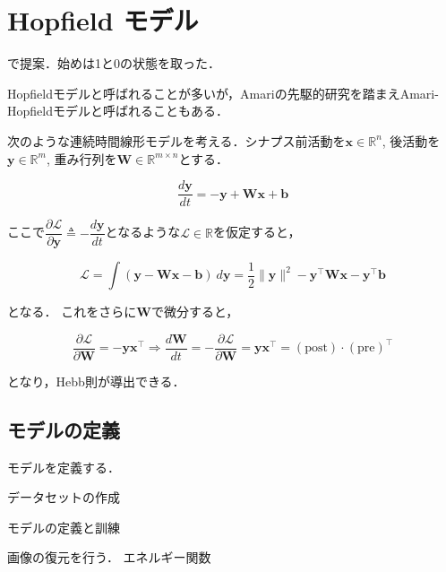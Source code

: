 \section{Hopfield モデル}


\citep{Hopfield1982-vu}で提案．始めは1と0の状態を取った．

Hopfieldモデルと呼ばれることが多いが，Amariの先駆的研究\citep{Amari1972-fq}を踏まえAmari-Hopfieldモデルと呼ばれることもある．

次のような連続時間線形モデルを考える．シナプス前活動を$\mathbf{x}\in \mathbb{R}^n$, 後活動を$\mathbf{y}\in \mathbb{R}^m$, 重み行列を$\mathbf{W}\in \mathbb{R}^{m\times n}$とする．


\begin{equation}
\frac{d\mathbf{y}}{dt}=-\mathbf{y}+\mathbf{W}\mathbf{x}+\mathbf{b}
\end{equation}


ここで$\dfrac{\partial\mathcal{L}}{\partial\mathbf{y}}\triangleq-\dfrac{d\mathbf{y}}{dt}$となるような$\mathcal{L}\in \mathbb{R}$を仮定すると，


\begin{equation}
\mathcal{L}=\int \left(\mathbf{y}-\mathbf{W}\mathbf{x}-\mathbf{b}\right)\ d\mathbf{y}=\frac{1}{2}\|\mathbf{y}\|^2-\mathbf{y}^\top \mathbf{W}\mathbf{x}-\mathbf{y}^\top \mathbf{b}
\end{equation}


となる． これをさらに$\mathbf{W}$で微分すると，


\begin{equation}
\dfrac{\partial\mathcal{L}}{\partial\mathbf{W}}=-\mathbf{y}\mathbf{x}^\top\Rightarrow
\frac{d\mathbf{W}}{dt}=-\dfrac{\partial\mathcal{L}}{\partial\mathbf{W}}=\mathbf{y}\mathbf{x}^\top=(\text{post})\cdot (\text{pre})^\top
\end{equation}


となり，Hebb則が導出できる．
\subsection{モデルの定義}
モデルを定義する．



データセットの作成



モデルの定義と訓練



画像の復元を行う．
エネルギー関数


